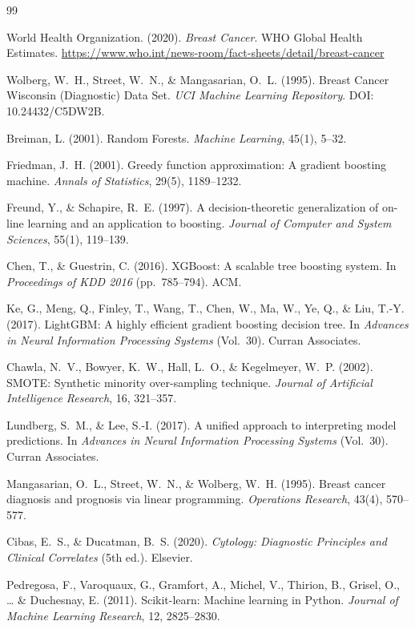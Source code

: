 \documentclass[10pt,letterpaper]{article}
\begin{document}
\begin{thebibliography}{99}

World Health Organization. (2020). \textit{Breast Cancer}. WHO Global Health Estimates.
\url{https://www.who.int/news-room/fact-sheets/detail/breast-cancer}

Wolberg, W.~H., Street, W.~N., \& Mangasarian, O.~L. (1995). Breast Cancer Wisconsin
(Diagnostic) Data Set. \textit{UCI Machine Learning Repository}. DOI: 10.24432/C5DW2B.

Breiman, L. (2001). Random Forests. \textit{Machine Learning}, 45(1), 5--32.

Friedman, J.~H. (2001). Greedy function approximation: A gradient boosting machine.
\textit{Annals of Statistics}, 29(5), 1189--1232.

Freund, Y., \& Schapire, R.~E. (1997). A decision-theoretic generalization of on-line learning
and an application to boosting. \textit{Journal of Computer and System Sciences}, 55(1),
119--139.

Chen, T., \& Guestrin, C. (2016). XGBoost: A scalable tree boosting system. In \textit{Proceedings
of KDD 2016} (pp.\ 785--794). ACM.

Ke, G., Meng, Q., Finley, T., Wang, T., Chen, W., Ma, W., Ye, Q., \& Liu, T.-Y. (2017).
LightGBM: A highly efficient gradient boosting decision tree. In \textit{Advances in Neural
Information Processing Systems} (Vol.\ 30). Curran Associates.

Chawla, N.~V., Bowyer, K.~W., Hall, L.~O., \& Kegelmeyer, W.~P. (2002). SMOTE: Synthetic
minority over-sampling technique. \textit{Journal of Artificial Intelligence Research}, 16,
321--357.

Lundberg, S.~M., \& Lee, S.-I. (2017). A unified approach to interpreting model predictions.
In \textit{Advances in Neural Information Processing Systems} (Vol.\ 30). Curran Associates.

Mangasarian, O.~L., Street, W.~N., \& Wolberg, W.~H. (1995). Breast cancer diagnosis and
prognosis via linear programming. \textit{Operations Research}, 43(4), 570--577.

Cibas, E.~S., \& Ducatman, B.~S. (2020). \textit{Cytology: Diagnostic Principles and Clinical
Correlates} (5th ed.). Elsevier.

Pedregosa, F., Varoquaux, G., Gramfort, A., Michel, V., Thirion, B., Grisel, O., \ldots{}
\& Duchesnay, E. (2011). Scikit-learn: Machine learning in Python. \textit{Journal of Machine
Learning Research}, 12, 2825--2830.

\end{thebibliography}
\end{document}
